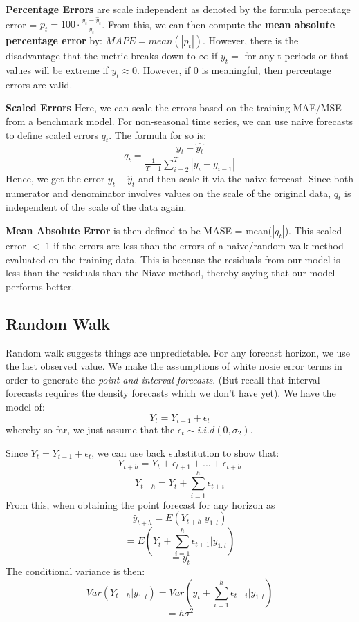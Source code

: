 \documentclass[11pt, oneside]{article}
\theoremstyle{definition}
\begin{document}
\textbf{Percentage Errors} are scale independent as denoted by the formula percentage error = $p_t = 100 \cdot \frac{y_t-\hat{y}_t}{y_t}$. From this, we can then compute the \textbf{mean absolute percentage error} by: $MAPE = mean(|p_t|)$. However, there is the disadvantage that the metric breaks down to $\infty$ if $y_t = $ for any t periods or that values will be extreme if $y_t \approx 0$. However, if 0 is meaningful, then percentage errors are valid.

\textbf{Scaled Errors} Here, we can scale the errors based on the training MAE/MSE from a benchmark model. For non-seasonal time series, we can use naive forecasts to define scaled errors $q_t$. The formula for so is:
$$
q_t = \frac{y_t - \hat{y_t}}{\frac{1}{T-1}\sum\limits_{i=2}^{T}|y_i-y_{i-1}|}
$$
Hence, we get the error $y_t - \hat{y}_t$ and then scale it via the naive forecast. Since both numerator and denominator involves values on the scale of the original data, $q_t$ is independent of the scale of the data again.

\textbf{Mean Absolute Error} is then defined to be MASE = mean($|q_t|$). This scaled error $<$ 1 if the errors are less than the errors of a naive/random walk method evaluated on the training data. This is because the residuals from our model is less than the residuals than the Niave method, thereby saying that our model performs better.


\subsection{Random Walk}
Random walk suggests things are unpredictable. For any forecast horizon, we use the last observed value. We make the assumptions of white nosie error terms in order to generate the \textit{point and interval forecasts}. (But recall that interval forecasts requires the density forecasts which we don't have yet). We have the model of:
$$
Y_t = Y_{t-1} + \epsilon_t
$$
whereby so far, we just assume that the $\epsilon_t \sim i.i.d(0,\sigma_2)$.

Since $Y_t = Y_{t-1} + \epsilon_t$, we can use back substitution to show that:
$$
Y_{t+h} = Y_t + \epsilon_{t+1} + ... + \epsilon_{t+h}
$$
$$
Y_{t+h} = Y_t + \sum\limits_{i=1}^h\epsilon_{t+i}
$$
From this, when obtaining the point forecast for any horizon as $$
\hat{y}_{t+h} = E(Y_{t+h}|y_{1:t})
$$
$$
=E(Y_t + \sum\limits_{i=1}^h\epsilon_{t+1}|y_{1:t})
$$
$$
= y_t
$$
The conditional variance is then:
$$
Var(Y_{t+h}|y_{1:t}) = Var(y_t + \sum\limits_{i=1}^{h}\epsilon_{t+i}|y_{1:t})
$$
$$
= h\sigma^2
$$
\end{document}
